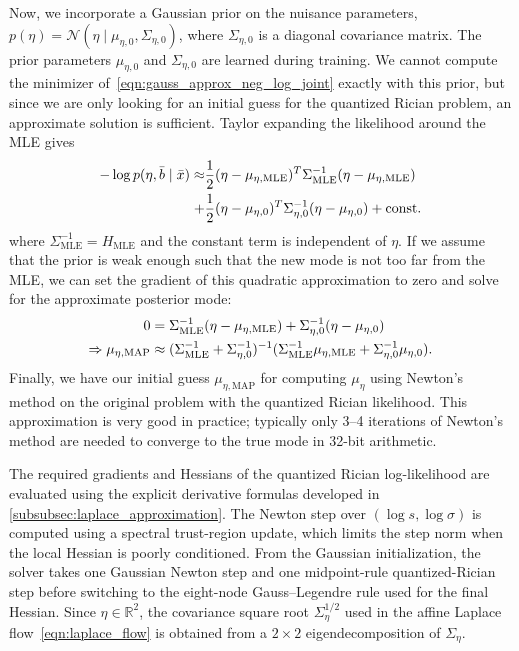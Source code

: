 Now, we incorporate a Gaussian prior on the nuisance parameters, $p(\eta) = \mathcal{N}(\eta \mid \mu_{\eta,0}, \Sigma_{\eta,0})$, where $\Sigma_{\eta,0}$ is a diagonal covariance matrix.
The prior parameters $\mu_{\eta,0}$ and $\Sigma_{\eta,0}$ are learned during training.
We cannot compute the minimizer of~\eqref{eqn:gauss_approx_neg_log_joint} exactly with this prior, but since we are only looking for an initial guess for the quantized Rician problem, an approximate solution is sufficient.
Taylor expanding the likelihood around the \gls*{MLE} gives
\begin{align*}
    -\log p(\eta, \bar{b} \mid \bar{x}) \approx & \frac{1}{2} (\eta - \mu_{\eta,\text{MLE}})^T \Sigma_{\text{MLE}}^{-1} (\eta - \mu_{\eta,\text{MLE}}) \\
    +                                                       & \frac{1}{2} (\eta - \mu_{\eta,0})^T \Sigma_{\eta,0}^{-1} (\eta - \mu_{\eta,0}) + \text{const}.
\end{align*}
where $\Sigma_{\text{MLE}}^{-1} = H_{\text{MLE}}$ and the constant term is independent of $\eta$.
If we assume that the prior is weak enough such that the new mode is not too far from the \gls*{MLE}, we can set the gradient of this quadratic approximation to zero and solve for the approximate posterior mode:
\begin{align}
    0                            & = \Sigma_{\text{MLE}}^{-1} (\eta - \mu_{\eta,\text{MLE}}) + \Sigma_{\eta,0}^{-1} (\eta - \mu_{\eta,0}) \nonumber                                     \\
    \Rightarrow \mu_{\eta,\text{MAP}} & \approx (\Sigma_{\text{MLE}}^{-1} + \Sigma_{\eta,0}^{-1})^{-1} (\Sigma_{\text{MLE}}^{-1} \mu_{\eta,\text{MLE}} + \Sigma_{\eta,0}^{-1} \mu_{\eta,0}).
\end{align}
Finally, we have our initial guess $\mu_{\eta,\text{MAP}}$ for computing $\mu_{\eta}$ using Newton's method on the original problem with the quantized Rician likelihood.
This approximation is very good in practice;
typically only 3--4 iterations of Newton's method are needed to converge to the true mode in 32-bit arithmetic.

The required gradients and Hessians of the quantized Rician log-likelihood are evaluated using the explicit derivative formulas developed in \cref{subsubsec:laplace_approximation}.
The Newton step over $(\log s, \log \sigma)$ is computed using a spectral trust-region update, which limits the step norm when the local Hessian is poorly conditioned.
From the Gaussian initialization, the solver takes one Gaussian Newton step and one midpoint-rule quantized-Rician step before switching to the eight-node Gauss--Legendre rule used for the final Hessian.
Since $\eta \in \mathbb{R}^2$, the covariance square root $\Sigma_{\eta}^{1/2}$ used in the affine Laplace flow~\cref{eqn:laplace_flow} is obtained from a $2 \times 2$ eigendecomposition of $\Sigma_{\eta}$.

